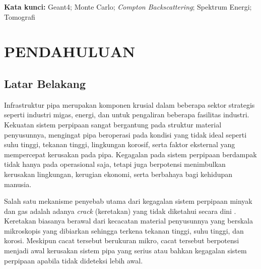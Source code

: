 \documentclass[12pt,a4paper]{report}
\begin{document}
    \noindent \textbf{Kata kunci:} Geant4; Monte Carlo; \textit{Compton Backscattering}; Spektrum Energi; Tomografi
    \onehalfspacing %

    \newpage
    \tableofcontents

    \newpage
    \listoffigures %

    \newpage
    \listoftables %
\chapter{PENDAHULUAN}
\setcounter{page}{1}

\section{Latar Belakang}
Infrastruktur pipa merupakan komponen krusial dalam beberapa sektor strategis seperti industri migas, energi, dan untuk pengaliran beberapa fasilitas industri. Kekuatan sistem perpipaan sangat bergantung pada struktur
material penyusunnya, mengingat pipa beroperasi pada kondisi yang tidak ideal seperti suhu tinggi, tekanan tinggi, lingkungan korosif, serta faktor eksternal yang mempercepat kerusakan pada pipa\cite{ref1}.
Kegagalan pada sistem perpipaan berdampak tidak hanya pada operasional saja, tetapi juga berpotensi menimbulkan kerusakan lingkungan, kerugian ekonomi, serta berbahaya bagi kehidupan manusia\cite{ref2}.

Salah satu mekanisme penyebab utama dari kegagalan sistem perpipaan minyak dan gas adalah adanya \textit{crack} (keretakan) yang tidak diketahui secara dini \cite{Wasim2022}. Keretakan biasanya berawal dari kecacatan material penyusunnya yang
berskala mikroskopis yang dibiarkan sehingga terkena tekanan tinggi, suhu tinggi, dan korosi\cite{Sun2021}. Meskipun cacat tersebut berukuran mikro, cacat tersebut berpotensi menjadi awal kerusakan sistem pipa yang serius atau bahkan kegagalan
sistem perpipaan apabila tidak dideteksi lebih awal\cite{Xie2022}.
\end{document}
